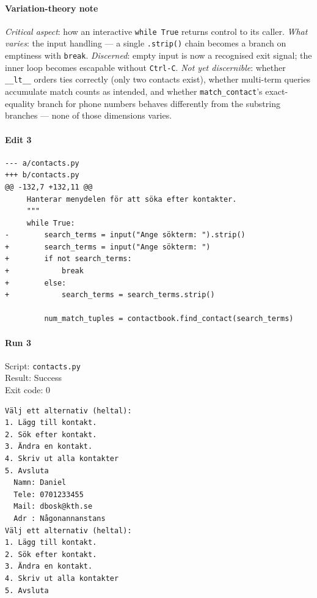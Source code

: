 \documentclass{article}
\begin{document}
\paragraph*{Variation-theory note}
\textit{Critical aspect}: how an interactive \verb|while True| returns
control to its caller.
\textit{What varies}: the input handling --- a single \verb|.strip()|
chain becomes a branch on emptiness with \verb|break|.
\textit{Discerned}: empty input is now a recognised exit signal; the
inner loop becomes escapable without \verb|Ctrl-C|.
\textit{Not yet discernible}: whether \verb|__lt__| orders ties
correctly (only two contacts exist), whether multi-term queries
accumulate match counts as intended, and whether
\verb|match_contact|'s exact-equality branch for phone numbers behaves
differently from the substring branches --- none of those dimensions
varies.

\vspace{1em}

\noindent
\begin{minipage}[t]{0.48\linewidth}
\paragraph{Edit 3}
\begin{verbatim}
--- a/contacts.py
+++ b/contacts.py
@@ -132,7 +132,11 @@
     Hanterar menydelen för att söka efter kontakter.
     """
     while True:
-        search_terms = input("Ange sökterm: ").strip()
+        search_terms = input("Ange sökterm: ")
+        if not search_terms:
+            break
+        else:
+            search_terms = search_terms.strip()
 
         num_match_tuples = contactbook.find_contact(search_terms)
\end{verbatim}
\end{minipage}
\hfill
\begin{minipage}[t]{0.48\linewidth}
\paragraph{Run 3}
Script: \texttt{contacts.py} \\
Result: Success \\
Exit code: 0

\begin{verbatim}
Välj ett alternativ (heltal):
1. Lägg till kontakt.
2. Sök efter kontakt.
3. Ändra en kontakt.
4. Skriv ut alla kontakter
5. Avsluta
  Namn: Daniel
  Tele: 0701233455
  Mail: dbosk@kth.se
  Adr : Någonannanstans
Välj ett alternativ (heltal):
1. Lägg till kontakt.
2. Sök efter kontakt.
3. Ändra en kontakt.
4. Skriv ut alla kontakter
5. Avsluta
\end{verbatim}
\end{minipage}
\end{document}
